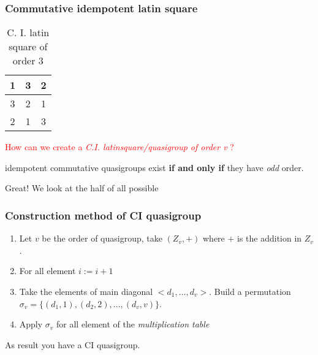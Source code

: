 \begin{frame}
\frametitle{Commutative idempotent latin square}
\begin{center}
	\begin{table}[]
		\begin{tabular}{|c|c|c|}
			\hline
			1 & 3 & 2 \\ \hline
			3 & 2 & 1 \\ \hline
			2 & 1 & 3 \\ \hline
		\end{tabular}
	\caption{C. I. latin square of order $3$}
	\end{table}
\end{center}
\pause
\textcolor{red}{How can we create a \textit{C.I. latinsquare/quasigroup of order v} ?}
\end{frame}

\begin{frame}
\begin{theorem}%
	idempotent commutative quasigroups exist \textbf{if and only if} they have \textit{odd} order.
\end{theorem}

Great! We look at the half of all possible
\end{frame}

\begin{frame}
\frametitle{Construction method of CI quasigroup}
\begin{enumerate}
	\item Let $v$ be the order of quasigroup, take $(Z_v,+)$ where $+$ is the addition in $Z_v$.
	\item For all element $i := i +1$
	\item Take the elements of main diagonal $<d_1,...,d_v>$. Build a permutation $\sigma_v = \{(d_1,1), (d_2,2),..., (d_v,v)\}$.
	\item Apply $\sigma_v$ for all element of the \textit{multiplication table}
\end{enumerate}
As result you have a CI quasigroup.
\end{frame}

